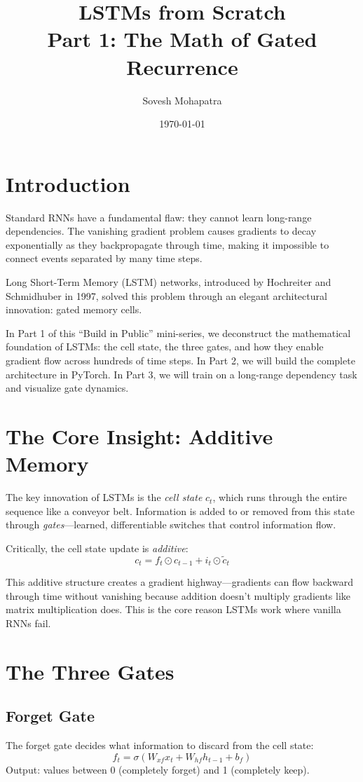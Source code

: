 \documentclass[12pt]{article}
\title{\textbf{LSTMs from Scratch \\ Part 1: The Math of Gated Recurrence}}
\author{Sovesh Mohapatra}
\date{\today}
\begin{document}
\maketitle

\section*{Introduction}
Standard RNNs have a fundamental flaw: they cannot learn long-range dependencies. The vanishing gradient problem causes gradients to decay exponentially as they backpropagate through time, making it impossible to connect events separated by many time steps.

Long Short-Term Memory (LSTM) networks, introduced by Hochreiter and Schmidhuber in 1997, solved this problem through an elegant architectural innovation: gated memory cells.

In Part 1 of this ``Build in Public'' mini-series, we deconstruct the mathematical foundation of LSTMs: the cell state, the three gates, and how they enable gradient flow across hundreds of time steps. In Part 2, we will build the complete architecture in PyTorch. In Part 3, we will train on a long-range dependency task and visualize gate dynamics.

\section*{The Core Insight: Additive Memory}
The key innovation of LSTMs is the \textit{cell state} $c_t$, which runs through the entire sequence like a conveyor belt. Information is added to or removed from this state through \textit{gates}---learned, differentiable switches that control information flow.

Critically, the cell state update is \textit{additive}:
\begin{equation}
    c_t = f_t \odot c_{t-1} + i_t \odot \tilde{c}_t
\end{equation}

This additive structure creates a gradient highway---gradients can flow backward through time without vanishing because addition doesn't multiply gradients like matrix multiplication does. This is the core reason LSTMs work where vanilla RNNs fail.

\section*{The Three Gates}

\subsection*{Forget Gate}
The forget gate decides what information to discard from the cell state:
\begin{equation}
    f_t = \sigma(W_{xf} x_t + W_{hf} h_{t-1} + b_f)
\end{equation}
Output: values between 0 (completely forget) and 1 (completely keep).
\end{document}
